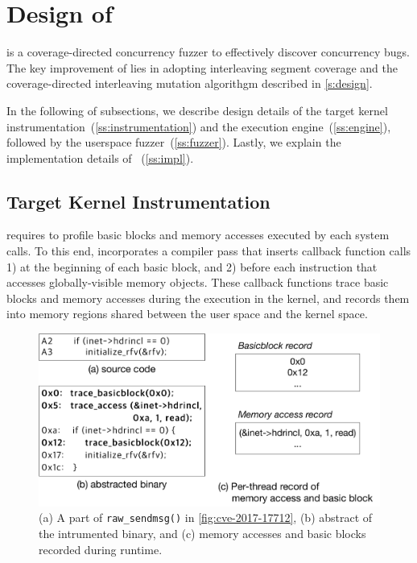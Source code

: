 \section{Design of \sys}
\label{s:impl}

\sys is a coverage-directed concurrency fuzzer to effectively discover
concurrency bugs.
%
The key improvement of \sys lies in adopting interleaving segment
coverage and the coverage-directed interleaving \dr{}mutation
algorithgm described in \autoref{s:design}.
%



In the following of subsections, we describe design details of the
target kernel instrumentation~(\autoref{ss:instrumentation}) and the
execution engine~(\autoref{ss:engine}), followed by the userspace
fuzzer~(\autoref{ss:fuzzer}).  Lastly, we explain the implementation
details of \sys~(\autoref{ss:impl}).


\subsection{Target Kernel Instrumentation}
\label{ss:instrumentation}

\sys requires to profile basic blocks and memory accesses executed by
each system calls.
%
To this end, \sys incorporates a compiler pass that inserts callback
function calls 1) at the beginning of each basic block, and 2) before
each instruction that accesses globally-visible memory objects.
%
These callback functions trace basic blocks and memory accesses during
the execution in the kernel, and records them into memory regions
shared between the user space and the kernel space.



\begin{figure}
  \centering
  \includegraphics[width=\linewidth]{fig/instrumentation.pdf}
  \caption{(a) A part of \texttt{raw_sendmsg()} in
    \autoref{fig:cve-2017-17712}, (b) abstract of the intrumented
    binary, and (c) memory accesses and basic blocks recorded during
    runtime.}
  \label{fig:instrumentation}
\end{figure}

